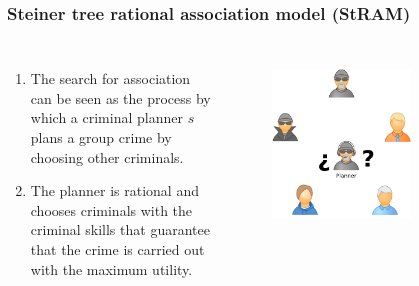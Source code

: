 \documentclass[aspectratio=169]{beamer}
\begin{document}
\begin{frame}
\frametitle{Steiner tree rational association model (StRAM)}
  \begin{columns}
    \begin{enumerate}
      \item The search for association can be seen as the process by which a criminal planner $s$ plans a group crime by choosing other criminals.
      \item The planner is rational and chooses criminals with the criminal skills that guarantee that the crime is carried out with the maximum utility.
    \end{enumerate}
    \begin{figure}[ht]
      \centering
       {\includegraphics[width=0.7\textwidth]{images/planner-1.pdf}}%
    \end{figure}
  \end{columns}
\end{frame}
\end{document}
